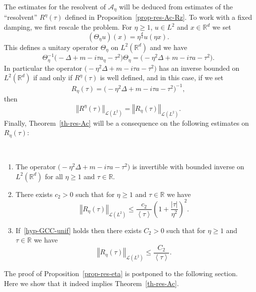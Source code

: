 \documentclass[10pt]{amsart}
\theoremstyle{definition}\newtheorem{defi}[theo]{Definition}\newtheorem{rema}[theo]{Remark}\newtheorem{exam}[theo]{Example}\newtheorem{exem}[theo]{Example}\newtheorem{nota}[theo]{Notation}
\newcommand{\abs}[1]{\left\vert #1\right\vert}
\newcommand{\nr}[1]{\left\Vert #1\right\Vert}
\newcommand{\pppg}[1] {\left< #1 \right>}
\renewcommand{\leq}{\leqslant}
\renewcommand{\geq}{\geqslant}
\newcommand{\inv}{^{-1}}
\newcommand{\1}{\mathds 1}
\newcommand{\R}{\mathbb{R}}
\newcommand{\D}{\Delta}
\newcommand{\Th}{\Theta}
\renewcommand{\t}{\tau}
\newcommand{\Ac}{{\mathcal A}}
\newcommand{\Lc}{{\mathcal L}}
\providecommand{\pointir}{.\ }
\begin{document}
The estimates for the resolvent of $\Ac_\eta$ will be deduced from estimates of the ``resolvent'' $R^\eta(\t)$ defined in Proposition~\ref{prop-res-Ac-Rz}. To work with a fixed damping, we first rescale the problem. For $\eta \geq 1$, $u \in L^2$ and $x \in \R^d$ we set
\[
(\Th_\eta u)(x) = \eta^{\frac d 2} u(\eta x).
\]
This defines a unitary operator $\Th_\eta$ on $L^2(\R^d)$ and we have
\[
\Th_\eta\inv \big(-\D + m -i \t a_\eta - \t^2\big) \Th_\eta = \big(-\eta^2 \D + m -i \t a - \t^2\big).
\]
In particular the operator $\big(-\eta^2 \D + m -i \t a - \t^2\big)$ has an inverse bounded on $L^2(\R^d)$ if and only if $R^\eta(\t)$ is well defined, and in this case, if we set
\begin{equation}\label{def-Reta}
R_\eta(\t) = \big(-\eta^2 \D + m -i \t a - \t^2\big)\inv,
\end{equation}
then
\begin{equation}\label{eq-norm-res-eta}
\nr{R^\eta(\t)}_{\Lc(L^2)} = \nr{R_\eta(\t)}_{\Lc(L^2)}.
\end{equation}
Finally, Theorem~\ref{th-res-Ac} will be a consequence on the following estimates on $R_\eta(\t)$:

\let\oldpointir\pointir
\renewcommand*{\pointir}{}
\begin{prop}\label{prop-res-eta}\ 
\begin{enumerate}%
\item The operator ${\big(-\eta^2 \D + m -i \t a - \t^2\big)}$ is invertible with bounded inverse on $L^2(\R^d)$ for all $\eta \geq 1$ and $\t \in \R$.
\item There exists $c_2 > 0$ such that for $\eta \geq 1$ and $\t \in \R$ we have
\[
\nr{R_\eta(\t)}_{\Lc(L^2)} \leq \frac {c_2}{\pppg \tau} \left(1 + \frac {\abs \t} {\eta^2} \right)^2.
\]
\item If~\eqref{hyp-GCC-unif} holds then there exists $C_2 > 0$ such that for $\eta \geq 1$ and $\t \in \R$ we have
\[
\nr{R_\eta(\t)}_{\Lc(L^2)} \leq \frac {C_2} {\pppg \t}.
\]
\end{enumerate}
\end{prop}
\let\pointir\oldpointir

The proof of Proposition~\ref{prop-res-eta} is postponed to the following section. Here we show that it indeed implies Theorem~\ref{th-res-Ac}.
\end{document}

